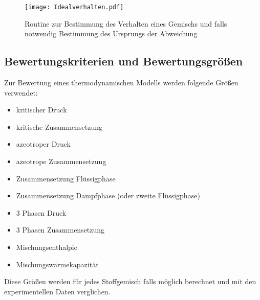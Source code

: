 \documentclass[../thesis.tex]{subfiles}
\begin{document}
\begin{figure}[htbp]
	\centering
	\texttt{[image: Idealverhalten.pdf]}
	\caption{Routine zur Bestimmung des Verhalten eines Gemischs und falls notwendig Bestimmung des Ursprungs der Abweichung}
	\label{fig: klassifikation}
\end{figure}

\subsection{Bewertungskriterien und Bewertungsgrößen}

Zur Bewertung eines thermodynamischen Modells werden folgende Größen verwendet:
\begin{itemize}
	\item kritischer Druck
	\item kritische Zusammensetzung
	\item azeotroper Druck
	\item azeotrope Zusammensetzung
	\item Zusammensetzung Flüssigphase
	\item Zusammensetzung Dampfphase (oder zweite Flüssigphase)
	\item 3 Phasen Druck
	\item 3 Phasen Zusammensetzung
	\item Mischungsenthalpie
	\item Mischungswärmekapazität
\end{itemize}

Diese Größen werden für jedes Stoffgemisch falls möglich berechnet und mit den experimentellen Daten verglichen.
\end{document}
